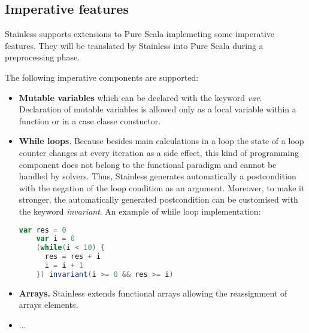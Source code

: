 \subsection{Imperative features}

Stainless supports extensions to Pure Scala implemeting some imperative features.
They will be translated by Stainless into Pure Scala during a preprocessing phase.

The following imperative components are supported:

\begin{itemize}
  \item \textbf{Mutable variables} which can be declared with the keyword \textit{var}.
  Declaration of mutable variables is allowed only as a local variable within a function or in a case classe constuctor.
  \item  \textbf{While loops}. 
  Because besides main calculations in a loop the state of a loop counter changes at every iteration as a side effect, this kind of programming component does not belong to the functional paradigm and cannot be handled by solvers.
  Thus, Stainless generates automatically a postcondition with the negation of the loop condition as an argument. 
  Moreover, to make it stronger, the automatically generated postcondition can be customised with the keyword \textit{invariant}.
  An example of while loop implementation:
  \begin{lstlisting}[language=Scala]
    var res = 0
    var i = 0
    (while(i < 10) {
      res = res + i
      i = i + 1
    }) invariant(i >= 0 && res >= i)
  \end{lstlisting}
  \item \textbf{Arrays.} Stainless extends functional arrays allowing the reassignment of arrays elements.
  \item ...
\end{itemize}